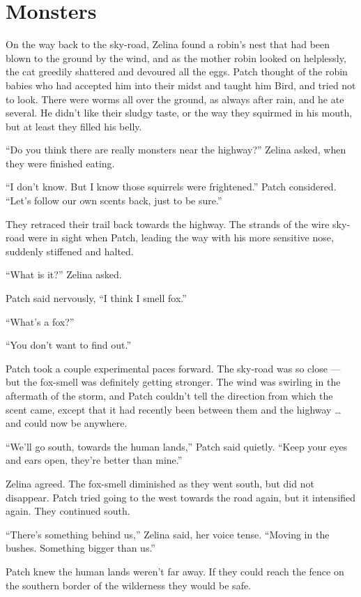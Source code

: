 \documentclass[12pt]{memoir}
\begin{document}

\section{Monsters}

On the way back to the sky-road, Zelina found a robin’s nest that had
been blown to the ground by the wind, and as the mother robin looked
on helplessly, the cat greedily shattered and devoured all the
eggs. Patch thought of the robin babies who had accepted him into
their midst and taught him Bird, and tried not to look. There were
worms all over the ground, as always after rain, and he ate
several. He didn’t like their sludgy taste, or the way they squirmed
in his mouth, but at least they filled his belly.

“Do you think there are really monsters near the highway?” Zelina
asked, when they were finished eating.

“I don’t know. But I know those squirrels were frightened.” Patch
considered. “Let’s follow our own scents back, just to be sure.”

They retraced their trail back towards the highway. The strands of the
wire sky-road were in sight when Patch, leading the way with his more
sensitive nose, suddenly stiffened and halted.

“What is it?” Zelina asked.

Patch said nervously, “I think I smell fox.”

“What’s a fox?”

“You don’t want to find out.”

Patch took a couple experimental paces forward. The sky-road was so
close — but the fox-smell was definitely getting stronger. The wind
was swirling in the aftermath of the storm, and Patch couldn’t tell
the direction from which the scent came, except that it had recently
been between them and the highway … and could now be anywhere.

“We’ll go south, towards the human lands,” Patch said quietly. “Keep
your eyes and ears open, they’re better than mine.”

Zelina agreed. The fox-smell diminished as they went south, but did
not disappear. Patch tried going to the west towards the road again,
but it intensified again. They continued south.

“There’s something behind us,” Zelina said, her voice tense. “Moving
in the bushes. Something bigger than us.”

Patch knew the human lands weren’t far away. If they could reach the
fence on the southern border of the wilderness they would be safe.
\end{document}
